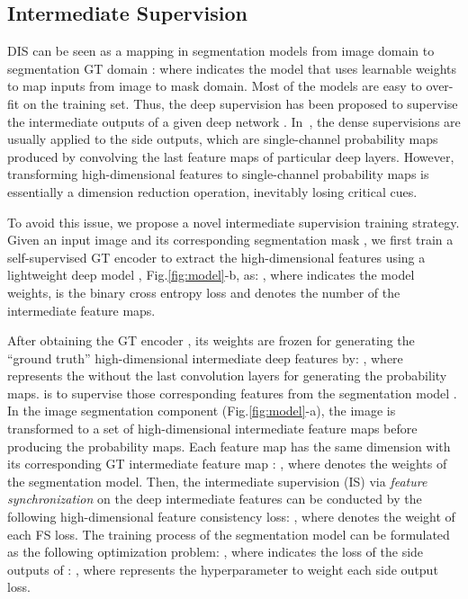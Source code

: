 \documentclass[10pt,twocolumn,letterpaper]{article}
\newcommand{\figref}[1]{Fig.\ref{#1}}
\begin{document}
\subsection{Intermediate Supervision}
DIS can be seen as a mapping in segmentation models from image domain  to segmentation GT domain :  where  indicates the model that uses learnable weights  to map inputs from image to mask domain. 
Most of the models are easy to over-fit on the training set. Thus, the deep supervision has been proposed to supervise the intermediate outputs of a given deep network \cite{lee2015deeply}. 
In~\cite{xie2015holistically,qin2020u2}, the dense supervisions are usually applied to the side outputs, which are single-channel probability maps produced by convolving the last feature maps of particular deep layers. 
However, transforming high-dimensional features to single-channel probability maps is essentially a dimension reduction operation, inevitably losing critical cues. 

To avoid this issue, we propose a novel intermediate supervision 
training strategy. Given an input image  and its corresponding segmentation mask , we first train a self-supervised GT encoder to extract the high-dimensional features using a lightweight deep model , \figref{fig:model}-b, as: 
, where  indicates the model weights,  is the binary cross entropy loss and  denotes the number of the intermediate feature maps. 

After obtaining the GT encoder , its weights  are frozen for generating the ``ground truth'' high-dimensional intermediate deep features by:
, 
where  represents the  without the last convolution layers for generating the probability maps.  is to supervise those corresponding features  from the segmentation model . In the image segmentation component  (\figref{fig:model}-a), the image  is transformed to a set of high-dimensional intermediate feature maps  before producing the probability maps. Each feature map  has the same dimension with its corresponding GT intermediate feature map : 
, 
where  denotes the weights of the segmentation model. Then, the intermediate supervision (IS) via \textit{feature synchronization} on the deep intermediate features can be conducted by the following high-dimensional feature consistency loss: 
, 
where  denotes the weight of each FS loss. 
The training process of the segmentation model  can be formulated as the following optimization problem:
, 
where  indicates the  loss of the side outputs of : 
,
where  represents the hyperparameter to weight each side output loss. 
\end{document}
